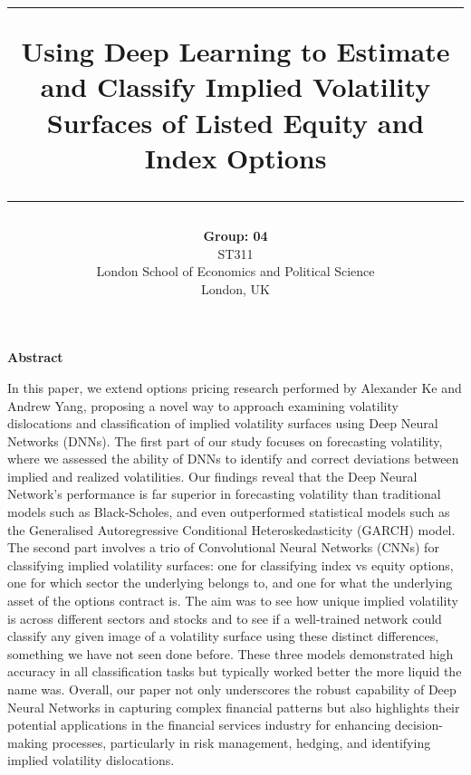 \documentclass[10pt]{article}
\makeatletter
\renewenvironment{abstract}{
  \if@twocolumn
    \section*{\abstractname} %
  \else
    \begin{center} %
      {\bfseries \Large Abstract\vspace{\z@}} %
    \end{center}
    \quotation %
  \fi
  }{
  \if@twocolumn\else\endquotation\fi
}
\makeatother
\begin{document}
\title{%
  \vspace{-1in} %
  \hrule height 2pt %
  \vspace{0.4cm} %
  \textbf{Using Deep Learning to Estimate and Classify Implied Volatility Surfaces of Listed Equity and Index Options} \\
  \vspace{0.4cm} %
  \hrule height 0.4pt %
}
\author{\textbf{Group: 04} \\ ST311 \\ London School of Economics and Political Science \\ London, UK}
\date{}
\maketitle

\begin{abstract}
    \noindent
    In this paper, we extend options pricing research performed by Alexander Ke and Andrew Yang\cite{ke2019option}, proposing a novel way to approach examining volatility dislocations and classification of implied volatility surfaces using Deep Neural Networks (DNNs). The first part of our study focuses on forecasting volatility, where we assessed the ability of DNNs to identify and correct deviations between implied and realized volatilities. Our findings reveal that the Deep Neural Network's performance is far superior in forecasting volatility than traditional models such as Black-Scholes, and even outperformed statistical models such as the Generalised Autoregressive Conditional Heteroskedasticity (GARCH) model. The second part involves a trio of Convolutional Neural Networks (CNNs) for classifying implied volatility surfaces: one for classifying index vs equity options, one for which sector the underlying belongs to, and one for what the underlying asset of the options contract is. The aim was to see how unique implied volatility is across different sectors and stocks and to see if a well-trained network could classify any given image of a volatility surface using these distinct differences, something we have not seen done before. These three models demonstrated high accuracy in all classification tasks but typically worked better the more liquid the name was. Overall, our paper not only underscores the robust capability of Deep Neural Networks in capturing complex financial patterns but also highlights their potential applications in the financial services industry for enhancing decision-making processes, particularly in risk management, hedging, and identifying implied volatility dislocations.
\end{abstract}
\end{document}
